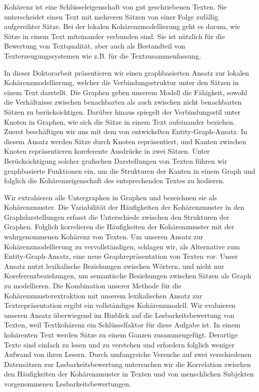 \addchap*{\abstractname}

Kohärenz ist eine Schlüsseleigenschaft von gut geschriebenen Texten. 
Sie unterscheidet einen Text mit mehreren Sätzen von einer Folge zufällig aufgereihter Sätze. 
Bei der lokalen Kohärenzmodellierung geht es darum, wie Sätze in einem Text miteinander verbunden sind.
Sie ist nützlich für die Bewertung von Textqualität, aber auch als Bestandteil von Texterzeugungssystemen wie z.B. für die Textzusammenfassung.

In dieser Doktorarbeit präsentieren wir einen graphbasierten Ansatz zur lokalen Kohärenzmodellierung, welcher die Verbindungsstruktur unter den Sätzen in einem Text darstellt. 
Die Graphen geben unserem Modell die Fähigkeit, sowohl die Verhältnisse zwischen benachbarten als auch zwischen nicht benachbarten Sätzen zu berücksichtigen.
Darüber hinaus spiegelt der Verbindungsstil unter Knoten in Graphen, wie sich die Sätze in einem Text aufeinander beziehen. 
Zuerst beschäftigen wir uns mit dem von  entwickelten \mbox{Entity-Graph-Ansatz}.
In diesem Ansatz werden Sätze durch Knoten repräsentiert, und Kanten zwischen Knoten repräsentieren koreferente Ausdrücke in zwei Sätzen.
Unter Berücksichtigung solcher grafischen Darstellungen von Texten führen wir graphbasierte Funktionen ein, um die Strukturen der Kanten in einem Graph und folglich die Kohärenzeigenschaft des entsprechenden Textes zu kodieren. 

Wir extrahieren alle Untergraphen in Graphen und bezeichnen sie als Kohärenzmuster. 
Die Variabilität der Häufigkeiten der Kohärenzmuster in den Graphdarstellungen erfasst die Unterschiede zwischen den Strukturen der Graphen. 
Folglich korrelieren die Häufigkeiten der Kohärenzmuster mit der wahrgenommenen Kohärenz von Texten.
Um unseren Ansatz zur Kohärenzmodellierung zu vervollständigen, schlagen wir, als Alternative zum Entity-Graph-Ansatz, eine neue Graphrepräsentation von Texten vor. 
Unser Ansatz nutzt lexikalische Beziehungen zwischen Wörtern, und nicht nur Koreferenzbeziehungen, um semantische Beziehungen zwischen Sätzen als Graph zu modellieren. 
Die Kombination unserer Methode für die Kohärenzmusterextraktion mit unserem lexikalischen Ansatz zur Textrepräsentation ergibt ein vollständiges Kohärenzmodell.
Wir evaluieren unseren Ansatz überwiegend im Hinblick auf die Lesbarkeitsbewertung von Texten, weil Textkohärenz ein Schlüsselfaktor für diese Aufgabe ist. 
In einem kohärenten Text werden Sätze zu einem Ganzen zusammengefügt. 
Derartige Texte sind einfach zu lesen und zu verstehen und erfordern folglich weniger Aufwand von ihren Lesern.
Durch umfangreiche Versuche auf zwei verschiedenen Datensätzen zur Lesbarkeitsbewertung untersuchen wir die Korrelation zwischen den Häufigkeiten der Kohärenzmuster in
Texten und von menschlichen Subjekten vorgenommenen Lesbarkeitsbewertungen.

